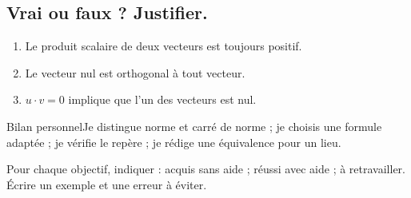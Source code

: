 \subsection*{Vrai ou faux ? Justifier.}\label{C03-VF}
\begin{enumerate}
\item Le produit scalaire de deux vecteurs est toujours positif.
\item Le vecteur nul est orthogonal à tout vecteur.
\item $u\cdot v=0$ implique que l’un des vecteurs est nul.
\end{enumerate}
\begin{repere}{Bilan personnel}Je distingue norme et carré de norme ; je choisis une formule adaptée ; je vérifie le repère ; je rédige une équivalence pour un lieu.

Pour chaque objectif, indiquer : acquis sans aide ; réussi avec aide ; à retravailler. Écrire un exemple et une erreur à éviter.\end{repere}
\endgroup
\ifprof\fi
